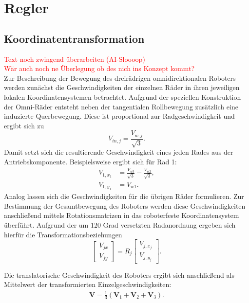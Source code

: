 \chapter{Regler}

\section{Koordinatentransformation}
\textcolor{red}{Text noch zwingend überarbeiten (AI-Sloooop)\\ Wär auch noch ne Überlegung ob des nich ins Konzept kommt?}\\
Zur Beschreibung der Bewegung des dreirädrigen omnidirektionalen Roboters werden zunächst die Geschwindigkeiten der einzelnen Räder in ihren jeweiligen lokalen Koordinatensystemen betrachtet. Aufgrund der speziellen Konstruktion der Omni-Räder entsteht neben der tangentialen Rollbewegung zusätzlich eine induzierte Querbewegung. Diese ist proportional zur Radgeschwindigkeit und ergibt sich zu
\begin{equation}
    V_{in,j} = \frac{V_{w,j}}{\sqrt{3}}.
\end{equation}
Damit setzt sich die resultierende Geschwindigkeit eines jeden Rades aus der Antriebskomponente. Beispielsweise ergibt sich für Rad 1:
\begin{align}
    V_{1,x_1} &= \frac{V_{w3}}{\sqrt{3}} - \frac{V_{w2}}{\sqrt{3}}, \\
    V_{1,y_1} &= V_{w1}.
\end{align}
Analog lassen sich die Geschwindigkeiten für die übrigen Räder formulieren.
Zur Bestimmung der Gesamtbewegung des Roboters werden diese Geschwindigkeiten anschließend mittels Rotationsmatrizen in das roboterfeste Koordinatensystem überführt. Aufgrund der um 120 Grad versetzten Radanordnung ergeben sich hierfür die Transformationsbeziehungen
\begin{equation}
    \begin{bmatrix}
        V_{jx} \\
        V_{jy}
    \end{bmatrix}
    =
    R_j
    \begin{bmatrix}
        V_{j,x_j} \\
        V_{j,y_j}
    \end{bmatrix}.
\end{equation}

Die translatorische Geschwindigkeit des Roboters ergibt sich anschließend als Mittelwert der transformierten Einzelgeschwindigkeiten:
\begin{align}
\mathbf{V} = \frac{1}{3} \left( \mathbf{V}_1 + \mathbf{V}_2 + \mathbf{V}_3 \right).
\end{align}

